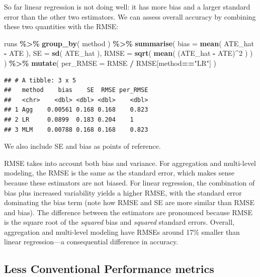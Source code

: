 \documentclass[
]{book}
\newenvironment{Shaded}{\begin{snugshade}}{\end{snugshade}}
\newcommand{\AttributeTok}[1]{\textcolor[rgb]{0.13,0.29,0.53}{#1}}
\newcommand{\DecValTok}[1]{\textcolor[rgb]{0.00,0.00,0.81}{#1}}
\newcommand{\FunctionTok}[1]{\textcolor[rgb]{0.13,0.29,0.53}{\textbf{#1}}}
\newcommand{\NormalTok}[1]{#1}
\newcommand{\SpecialCharTok}[1]{\textcolor[rgb]{0.81,0.36,0.00}{\textbf{#1}}}
\newcommand{\StringTok}[1]{\textcolor[rgb]{0.31,0.60,0.02}{#1}}
\begin{document}
So far linear regression is not doing well: it has more bias and a larger standard error than the other two estimators.
We can assess overall accuracy by combining these two quantities with the RMSE:

\begin{Shaded}
\begin{Highlighting}[]
\NormalTok{runs }\SpecialCharTok{\%\textgreater{}\%} 
  \FunctionTok{group\_by}\NormalTok{( method ) }\SpecialCharTok{\%\textgreater{}\%}
  \FunctionTok{summarise}\NormalTok{( }
    \AttributeTok{bias =} \FunctionTok{mean}\NormalTok{( ATE\_hat }\SpecialCharTok{{-}}\NormalTok{ ATE ),}
    \AttributeTok{SE =} \FunctionTok{sd}\NormalTok{( ATE\_hat ),}
    \AttributeTok{RMSE =} \FunctionTok{sqrt}\NormalTok{( }\FunctionTok{mean}\NormalTok{( (ATE\_hat }\SpecialCharTok{{-}}\NormalTok{ ATE)}\SpecialCharTok{\^{}}\DecValTok{2}\NormalTok{ ) )}
\NormalTok{  ) }\SpecialCharTok{\%\textgreater{}\%}
  \FunctionTok{mutate}\NormalTok{( }
    \AttributeTok{per\_RMSE =}\NormalTok{ RMSE }\SpecialCharTok{/}\NormalTok{ RMSE[method}\SpecialCharTok{==}\StringTok{"LR"}\NormalTok{]}
\NormalTok{  )}
\end{Highlighting}
\end{Shaded}

\begin{verbatim}
## # A tibble: 3 x 5
##   method    bias    SE  RMSE per_RMSE
##   <chr>    <dbl> <dbl> <dbl>    <dbl>
## 1 Agg    0.00561 0.168 0.168    0.823
## 2 LR     0.0899  0.183 0.204    1    
## 3 MLM    0.00788 0.168 0.168    0.823
\end{verbatim}

We also include SE and bias as points of reference.

RMSE takes into account both bias and variance.
For aggregation and multi-level modeling, the RMSE is the same as the standard error, which makes sense because these estimators are not biased.
For linear regression, the combination of bias plus increased variability yields a higher RMSE, with the standard error dominating the bias term (note how RMSE and SE are more similar than RMSE and bias).
The difference between the estimators are pronounced because RMSE is the square root of the \emph{squared} bias and \emph{squared} standard errors.
Overall, aggregation and multi-level modeling have RMSEs around 17\% smaller than linear regression---a consequential difference in accuracy.

\subsection{Less Conventional Performance metrics}\label{less-conventional-performance-metrics}
\end{document}
